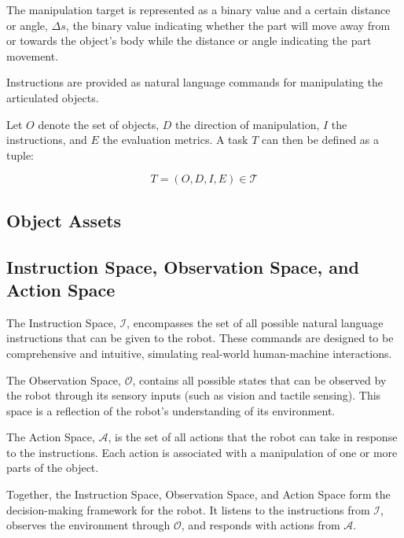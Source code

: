 The manipulation target is represented as a binary value and a certain distance or angle, $\Delta s$, the binary value indicating whether the part will move away from or towards the object's body while the distance or angle indicating the part movement.

Instructions are provided as natural language commands for manipulating the articulated objects.

Let $O$ denote the set of objects, $D$ the direction of manipulation, $I$ the instructions, and $E$ the evaluation metrics. A task $T$ can then be defined as a tuple:

$$T=(O,D,I,E)\in \mathcal{T}$$

\subsection{Object Assets}

\subsection{Instruction Space, Observation Space, and Action Space}
The Instruction Space, $\mathcal{I}$, encompasses the set of all possible natural language instructions that can be given to the robot. These commands are designed to be comprehensive and intuitive, simulating real-world human-machine interactions.

The Observation Space, $\mathcal{O}$, contains all possible states that can be observed by the robot through its sensory inputs (such as vision and tactile sensing). This space is a reflection of the robot's understanding of its environment.

The Action Space, $\mathcal{A}$, is the set of all actions that the robot can take in response to the instructions. Each action is associated with a manipulation of one or more parts of the object.

Together, the Instruction Space, Observation Space, and Action Space form the decision-making framework for the robot. It listens to the instructions from $\mathcal{I}$, observes the environment through $\mathcal{O}$, and responds with actions from $\mathcal{A}$.


